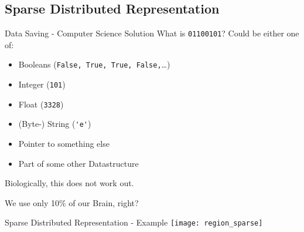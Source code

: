 
\subsection{Sparse Distributed Representation}


\begin{frame}[c,fragile]{Data Saving - Computer Science Solution}
    \Large
    What is \verb|01100101|? \pause Could be either one of:
    \begin{itemize}[<+(1)->]
        \item Booleans (\verb|False, True, True, False,|\dots)
        \item Integer (\verb|101|)
        \item Float (\verb|3328|)
        \item (Byte-) String (\verb|'e'|)
        \item Pointer to something else
        \item Part of some other Datastructure
    \end{itemize}
\end{frame}

% 
% 
% 


\begin{frame}[standout]
    \Large
    Biologically, this does not work out.

    \pause
    We use only 10\% of our Brain, right?
\end{frame}


\begin{frame}[c]{Sparse Distributed Representation - Example}
    \pause
    \texttt{[image: region\_sparse]}
\end{frame}


